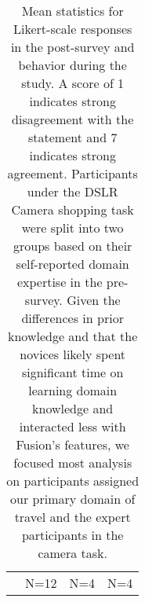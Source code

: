 \begin{table}
\begin{tabular}{ r  r l   r l r l }
	
	\hline
	
	&
	\multicolumn{2}{r}{N=12} &
	\multicolumn{2}{r}{N=4} &
	\multicolumn{2}{r}{N=4} \\
	
  \end{tabular}
  \caption[Mean statistics for post-survey Likert-scale responses and behavior during the study]{Mean statistics for Likert-scale responses in the post-survey and behavior during the study. A score of 1 indicates strong disagreement with the statement and 7 indicates strong agreement. Participants under the DSLR Camera shopping task were split into two groups based on their self-reported domain expertise in the pre-survey. Given the differences in prior knowledge and that the novices likely spent significant time on learning domain knowledge and interacted less with Fusion's features, we focused most analysis on participants assigned our primary domain of travel and the expert participants in the camera task.}
  \label{tab:fusion_results}
\end{table}